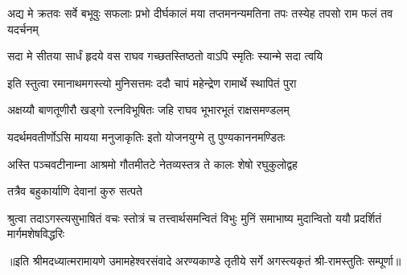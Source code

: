 \threelineshloka
{अद्य मे क्रतवः सर्वे बभूवुः सफलाः प्रभो}
{दीर्घकालं मया तप्तमनन्यमतिना तपः}
{तस्येह तपसो राम फलं तव यदर्चनम्} %

\twolineshloka
{सदा मे सीतया सार्धं हृदये वस राघव}
{गच्छतस्तिष्ठतो वाऽपि स्मृतिः स्यान्मे सदा त्वयि} %

\twolineshloka
{इति स्तुत्वा रमानाथमगस्त्यो मुनिसत्तमः}
{ददौ चापं महेन्द्रेण रामार्थे स्थापितं पुरा} %

\twolineshloka
{अक्षय्यौ बाणतूणीरौ खड्गो रत्नविभूषितः}
{जहि राघव भूभारभूतं राक्षसमण्डलम्} %

\twolineshloka
{यदर्थमवतीर्णोऽसि मायया मनुजाकृतिः}
{इतो योजनयुग्मे तु पुण्यकाननमण्डितः} %

\twolineshloka
{अस्ति पञ्चवटीनाम्ना आश्रमो गौतमीतटे}
{नेतव्यस्तत्र ते कालः शेषो रघुकुलोद्वह} %

\onelineshloka
{तत्रैव बहुकार्याणि देवानां कुरु सत्पते} %


\fourlineindentedshloka
{श्रुत्वा तदाऽगस्त्यसुभाषितं वचः}
{स्तोत्रं च तत्त्वार्थसमन्वितं विभुः}
{मुनिं समाभाष्य मुदान्वितो ययौ}
{प्रदर्शितं मार्गमशेषविद्धरिः} %

{॥इति श्रीमदध्यात्मरामायणे उमामहेश्वरसंवादे अरण्यकाण्डे
तृतीये सर्गे अगस्त्यकृतं श्री-रामस्तुतिः सम्पूर्णा॥}
